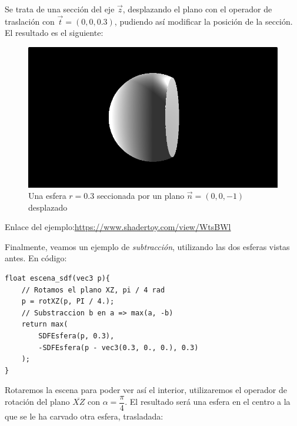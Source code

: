 Se trata de una sección del eje \(\Vec{z}\), desplazando el plano con el operador de traslación con \(\Vec{t}=(0,0,0.3)\), pudiendo así modificar la posición de la sección. El resultado es el siguiente:

\begin{figure}[H]
  \centering
  \captionsetup{justification=centering}%
  \includegraphics[width=1.0\textwidth]{secciones/imagenes/sdf/3d/sdf_seccion_3d.png}
  \caption{Una esfera \(r=0.3\) seccionada por un plano \(\Vec{n}=(0,0,-1)\) desplazado}
  \label{fig:seccion}
\end{figure}

Enlace del ejemplo:\url{https://www.shadertoy.com/view/WtsBWl}

Finalmente, veamos un ejemplo de \textit{subtracción}, utilizando las dos esferas vistas antes. En código:

\begin{lstlisting}
float escena_sdf(vec3 p){
    // Rotamos el plano XZ, pi / 4 rad
    p = rotXZ(p, PI / 4.);
    // Substraccion b en a => max(a, -b)
    return max(
        SDFEsfera(p, 0.3),
        -SDFEsfera(p - vec3(0.3, 0., 0.), 0.3)
    );
}
\end{lstlisting}


Rotaremos la escena para poder ver así el interior, utilizaremos el operador de rotación del plano \(\overline{XZ}\) con \(\alpha=\dfrac{\pi}{4}\). El resultado será una esfera en el centro a la que se le ha carvado otra esfera, trasladada:

